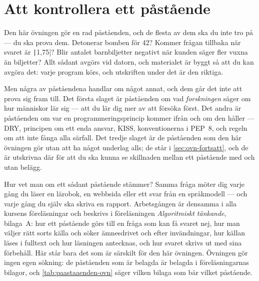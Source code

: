 \chapter{Att kontrollera ett påstående}
\label{app:verifiera-ovning-inmatning}

Den här övningen gör en rad påståenden, och de flesta av dem ska du inte
tro på --- du ska prova dem.  Detonerar bomben för 42?  Kommer frågan
tillbaka när svaret är \texttt|1,75|?  Blir antalet
barnbiljetter negativt när kunden säger fler vuxna än biljetter?  Allt
sådant avgörs vid datorn, och materialet är byggt så att du kan avgöra
det: varje program körs, och utskriften under det är den riktiga.

Men några av påståendena handlar om något annat, och dem går det inte
att prova sig fram till.  Det första slaget är påståenden om vad
\emph{forskningen} säger om hur människor lär sig
--- att du lär dig mer av att försöka först.  Det andra är påståenden om var en
programmeringsprincip kommer ifrån och om den håller ---
\foreignlanguage{english}{DRY}, principen om ett enda ansvar,
\foreignlanguage{english}{KISS}, konventionerna i PEP~8, och regeln om
att inte fånga alla särfall.  Det tredje slaget är de påståenden som den
här övningen gör utan att ha något underlag alls; de står i
\cref{sec:ovn-fortsatt}, och de är utskrivna där för att du ska kunna se
skillnaden mellan ett påstående med och utan belägg.

Hur vet man om ett sådant påstående stämmer?  Samma fråga möter dig
varje gång du läser en lärobok, en webbsida eller ett svar från en
språkmodell --- och varje gång du själv ska skriva en rapport.
Arbetsgången är densamma i alla kursens föreläsningar och beskrivs i
föreläsningen \emph{Algoritmiskt tänkande}, bilaga~A: hur ett påstående
görs till en fråga som kan få svaret nej, hur man väljer rätt sorts
källa och söker ämnesdrivet och efter invändningar, hur källan läses i
fulltext och hur läsningen antecknas, och hur svaret skrivs ut med sina
förbehåll.  Här står bara det som är särskilt för den här övningen.
Övningen gör ingen egen sökning: de påståenden som är belagda är
belagda i föreläsningarnas bilagor, och \cref{tab:paastaaenden-ovn}
säger vilken bilaga som bär vilket påstående.

